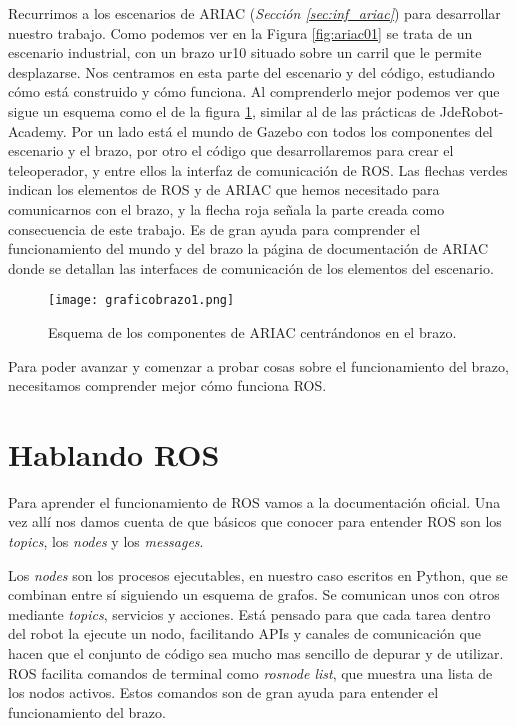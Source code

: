Recurrimos a los escenarios de ARIAC (\textit{Sección \ref{sec:inf_ariac}}) para desarrollar nuestro trabajo. Como podemos ver en la Figura \ref{fig:ariac01} se trata de un escenario industrial, con un brazo ur10 situado sobre un carril que le permite desplazarse. Nos centramos en esta parte del escenario y del código, estudiando cómo está construido y cómo funciona. Al comprenderlo mejor podemos ver que sigue un esquema como el de la figura \ref{fig:graficobrazo}, similar al de las prácticas de JdeRobot-Academy. Por un lado está el mundo de Gazebo con todos los componentes del escenario y el brazo, por otro el código que desarrollaremos para crear el teleoperador, y entre ellos la interfaz de comunicación de ROS. Las flechas verdes indican los elementos de ROS y de ARIAC que hemos necesitado para comunicarnos con el brazo, y la flecha roja señala la parte creada como consecuencia de este trabajo. Es de gran ayuda para comprender el funcionamiento del mundo y del brazo la página de documentación de ARIAC\cite{ariacwiki} donde se detallan las interfaces de comunicación de los elementos del escenario.

\begin{figure}[h]
	\centering\texttt{[image: graficobrazo1.png]}
	\caption{Esquema de los componentes de ARIAC centrándonos en el brazo.}
	\label{fig:graficobrazo}
\end{figure}

Para poder avanzar y comenzar a probar cosas sobre el funcionamiento del brazo, necesitamos comprender mejor cómo funciona ROS. 

\section{Hablando ROS}
\label{sec:br_hablandoros}

Para aprender el funcionamiento de ROS vamos a la documentación oficial\cite{roswiki}. Una vez allí nos damos cuenta de que básicos que conocer para entender ROS son los \textit{topics}, los \textit{nodes} y  los \textit{messages}. 

Los \textit{nodes} son los procesos ejecutables, en nuestro caso escritos en Python, que se combinan entre sí siguiendo un esquema de grafos. Se comunican unos con otros mediante \textit{topics}, servicios y acciones. Está pensado para que cada tarea dentro del robot la ejecute un nodo, facilitando APIs y canales de comunicación que hacen que el conjunto de código sea mucho mas sencillo de depurar y de utilizar. ROS facilita comandos de terminal como \textit{rosnode list}, que muestra una lista de los nodos activos. Estos comandos son de gran ayuda para entender el funcionamiento del brazo.

